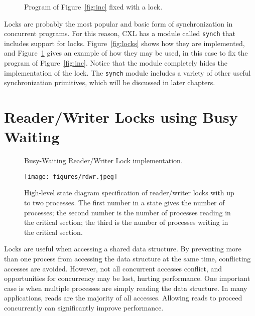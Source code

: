 \documentclass{report}
\newenvironment{code}{
\tcolorbox
}{
\endtcolorbox
}
\begin{document}
\begin{figure}
\begin{code}
\end{code}
\caption{Program of Figure~\ref{fig:inc} fixed with a lock.}
\label{fig:incfixed}
\end{figure}

Locks are probably the most popular and basic form of synchronization
in concurrent programs.  For this reason, CXL has a module called
\texttt{synch} that includes support for locks.
Figure~\ref{fig:locks} shows how they are implemented, and
Figure~\ref{fig:incfixed} gives an example of how they may be used,
in this case to fix the program of Figure~\ref{fig:inc}.
Notice that the module completely hides the implementation of the
lock.
The \texttt{synch} module includes a variety of other useful
synchronization primitives, which will be discussed in later
chapters.

\chapter{Reader/Writer Locks using Busy Waiting}

\begin{figure}
\begin{code}
\end{code}
\caption{Busy-Waiting Reader/Writer Lock implementation.}
\label{fig:rwbusy}
\end{figure}

\begin{figure}
\begin{center}
\texttt{[image: figures/rdwr.jpeg]}
\end{center}
\caption{High-level state diagram specification of reader/writer locks with
up to two processes.
The first number in a state gives the number of processes; the second number is the
number of processes reading in the critical section; the third is the number of
processes writing in the critical section.}
\label{fig:rdwr}
\end{figure}

Locks are useful when accessing a shared data structure.  By preventing
more than one process from accessing the data structure at the same
time, conflicting accesses are avoided.  However, not all concurrent
accesses conflict, and opportunities for concurrency may be lost,
hurting performance.  One important case is when multiple processes
are simply reading the data structure.
In many applications, reads are the majority of all accesses.
Allowing reads to proceed concurrently can significantly improve performance.
\end{document}
